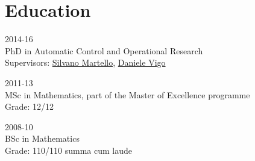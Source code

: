 \section*{Education}

\begin{paracol}{2}
  \textsc{2014-16}
\switchcolumn
  \\
  PhD in Automatic Control and Operational Research\\
  Supervisors: \href{https://scholar.google.com/citations?user=o4a20zsAAAAJ}{Silvano Martello}, \href{https://scholar.google.com/citations?user=2kk8d_AAAAAJ}{Daniele Vigo}
\end{paracol}

\begin{paracol}{2}
  \textsc{2011-13}
\switchcolumn
  \\
  MSc in Mathematics, part of the Master of Excellence programme\\
  Grade: 12/12
\end{paracol}

\begin{paracol}{2}
  \textsc{2008-10}
\switchcolumn
  \\
  BSc in Mathematics\\
  Grade: 110/110 summa cum laude
\end{paracol}

